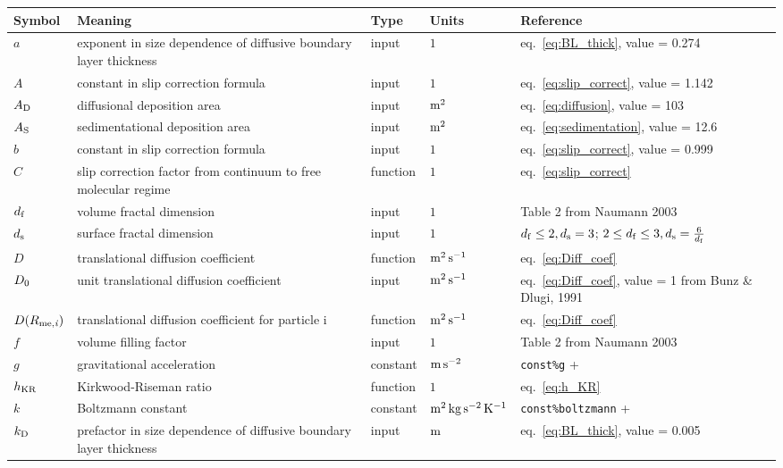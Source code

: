 \documentclass{article}
\begin{document}
\newcommand{\rr}{\raggedright}
\newcommand{\tn}{\tabularnewline\hline}
\renewcommand{\arraystretch}{1.5}
\begin{longtable}{|l|p{5.5cm}|l|l|p{4.5cm}|}
\hline \textbf{Symbol} & \textbf{Meaning}                                                       & \textbf{Type} & \textbf{Units}                        &  \textbf{Reference}                                \tn
\hline \endhead
$a$					   & \rr exponent in size dependence of diffusive boundary layer thickness	& input			& $1$									& \rr eq.~\ref{eq:BL_thick}, value = 0.274			 \tn
$A$					   & \rr constant in slip correction formula								& input			& $1$									& \rr eq.~\ref{eq:slip_correct}, value = 1.142		 \tn
$A_{\rm D}$			   & \rr diffusional deposition area										& input			& $\rm m^2$								& \rr eq.~\ref{eq:diffusion}, value = 103			 \tn
$A_{\rm S}$			   & \rr sedimentational deposition area									& input			& $\rm m^2$								& \rr eq.~\ref{eq:sedimentation}, value = 12.6		 \tn
$b$					   & \rr constant in slip correction formula								& input			& $1$									& \rr eq.~\ref{eq:slip_correct}, value = 0.999		 \tn
$C$					   & \rr slip correction factor from continuum to free molecular regime		& function		& $1$									& \rr eq.~\ref{eq:slip_correct}						 \tn
$d_{\rm f}$			   & \rr volume fractal dimension											& input			& $1$									& \rr Table 2 from Naumann 2003						 \tn
$d_{\rm s}$			   & \rr surface fractal dimension											& input			& $1$									& \rr $d_{\rm f} \leq 2, d_{\rm s} = 3$; $2 \leq d_{\rm f} \leq 3, d_{\rm s} = \frac{6}{d_{\rm f}}$				 \tn
$D$					   & \rr translational diffusion coefficient								& function		& $\rm m^2 \, s^{-1}$					& \rr eq.~\ref{eq:Diff_coef}						 \tn
$D_{\rm 0}$			   & \rr unit translational diffusion coefficient							& input			& $\rm m^2 \, s^{-1}$					& \rr eq.~\ref{eq:Diff_coef}, value = 1 from Bunz \& Dlugi, 1991		 \tn
$D(R_{\rm me,\it i})$  & \rr translational diffusion coefficient for particle i					& function		& $\rm m^2 \, s^{-1}$					& \rr eq.~\ref{eq:Diff_coef}						 \tn
$f$					   & \rr volume filling factor												& input			& $1$									& \rr Table 2 from Naumann 2003						 \tn
$g$					   & \rr gravitational acceleration											& constant		& $\rm m \, s^{-2}$						& \rr \verb+const%g+			 					 \tn
$h_{\rm KR}$		   & \rr Kirkwood-Riseman ratio												& function		& $1$									& \rr eq.~\ref{eq:h_KR}			 					 \tn
$k$					   & \rr Boltzmann constant													& constant		& $\rm m^2 \, kg \, s^{-2} \, K^{-1}$	& \rr \verb+const%boltzmann+	 					 \tn
$k_{\rm D}$			   & \rr prefactor in size dependence of diffusive boundary layer thickness	& input			& $\rm m$								& \rr eq.~\ref{eq:BL_thick}, value = 0.005			 \tn

\end{longtable}
\end{document}
